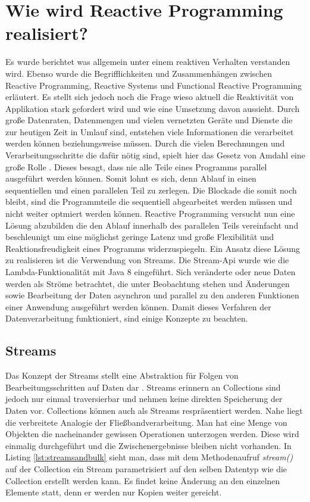 \section{Wie wird Reactive Programming realisiert?}
Es wurde berichtet was allgemein unter einem reaktiven Verhalten verstanden wird. Ebenso wurde die Begrifflichkeiten und Zusammenhängen zwischen Reactive Programming, Reactive Systems und Functional Reactive Programming erläutert. Es stellt sich jedoch noch die Frage wieso aktuell die Reaktivität von Applikation stark gefordert wird und wie eine Umsetzung davon aussieht. Durch große Datenraten, Datenmengen und vielen vernetzten Geräte und Dienste die zur heutigen Zeit in Umlauf sind, entstehen viele Informationen die verarbeitet werden können beziehungsweise müssen. Durch die vielen Berechnungen und Verarbeitungsschritte die dafür nötig sind, spielt hier das Gesetz von Amdahl eine große Rolle \cite{Amdahl.}. Dieses besagt, dass nie alle Teile eines Programms parallel ausgeführt werden können. Somit lohnt es sich, denn Ablauf in einen sequentiellen und einen parallelen Teil zu zerlegen. Die Blockade die somit noch bleibt, sind die Programmteile die sequentiell abgearbeitet werden müssen und nicht weiter optmiert werden können. Reactive Programming versucht nun eine Lösung abzubilden die den Ablauf innerhalb des parallelen Teils vereinfacht und beschleunigt um eine möglichst geringe Latenz und große Flexibilität und Reaktionsfreudigkeit eines Programms widerzuspiegeln. Ein Ansatz diese Lösung zu realisieren ist die Verwendung von Streams. Die Stream-Api wurde wie die Lambda-Funktionalität mit Java 8 eingeführt. Sich veränderte oder neue Daten werden als Ströme betrachtet, die unter Beobachtung stehen und Änderungen sowie Bearbeitung der Daten asynchron und parallel zu den anderen Funktionen einer Anwendung ausgeführt werden können. Damit dieses Verfahren der Datenverarbeitung funktioniert, sind einige Konzepte zu beachten.
\subsection{Streams}
Das Konzept der Streams stellt eine Abstraktion für Folgen von Bearbeitungsschritten auf Daten dar \cite{Inden.2015}. Streams erinnern an Collections sind jedoch nur einmal traversierbar und nehmen keine direkten Speicherung der Daten vor. Collections können auch als Streams respräsentiert werden. Nahe liegt die verbreitete Analogie der Fließbandverarbeitung. Man hat eine Menge von Objekten die nacheinander gewissen Operationen unterzogen werden. Diese wird einmalig durchgeführt und die Zwischenergebnisse bleiben nicht vorhanden. In Listing \ref{lst:streamsandbulk} sieht man, dass mit dem Methodenaufruf \textit{stream()} auf der Collection ein Stream parametrisiert auf den selben Datentyp wie die Collection erstellt werden kann. Es findet keine Änderung an den einzelnen Elemente statt, denn er werden nur Kopien weiter gereicht.

